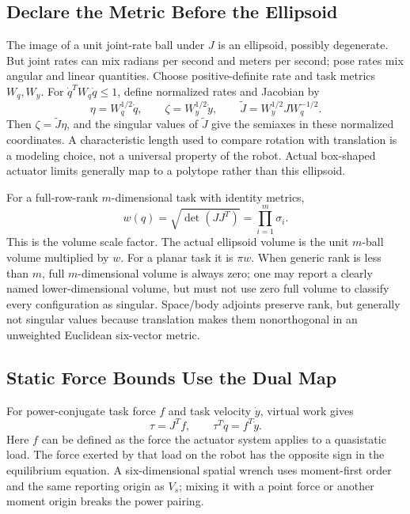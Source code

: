 \subsection{Declare the Metric Before the Ellipsoid}
\label{def:manipulability}\label{def:velocity_ellipsoid}

The image of a unit joint-rate ball under $J$ is an ellipsoid, possibly degenerate. But joint rates can mix radians per second and meters per second; pose rates mix angular and linear quantities. Choose positive-definite rate and task metrics $W_q,W_y$. For $\dot q^TW_q\dot q\leq1$, define normalized rates and Jacobian by
\begin{equation}
 \eta=W_q^{1/2}\dot q,\qquad \zeta=W_y^{1/2}\dot y,
 \qquad \widetilde J=W_y^{1/2}JW_q^{-1/2}.
\end{equation}
Then $\zeta=\widetilde J\eta$, and the singular values of $\widetilde J$ give the semiaxes in these normalized coordinates. A characteristic length used to compare rotation with translation is a modeling choice, not a universal property of the robot. Actual box-shaped actuator limits generally map to a polytope rather than this ellipsoid.

For a full-row-rank $m$-dimensional task with identity metrics,
\begin{equation}
 \label{eq:manipulability}
 w(q)=\sqrt{\det(JJ^T)}=\prod_{i=1}^m\sigma_i.
\end{equation}
This is the volume scale factor. The actual ellipsoid volume is the unit $m$-ball volume multiplied by $w$. For a planar task it is $\pi w$. When generic rank is less than $m$, full $m$-dimensional volume is always zero; one may report a clearly named lower-dimensional volume, but must not use zero full volume to classify every configuration as singular. Space/body adjoints preserve rank, but generally not singular values because translation makes them nonorthogonal in an unweighted Euclidean six-vector metric.

\subsection{Static Force Bounds Use the Dual Map}
\label{def:force_ellipsoid}\label{laymans:manipulability_duality}

For power-conjugate task force $f$ and task velocity $\dot y$, virtual work gives
\begin{equation}
 \tau=J^Tf,\qquad \tau^T\dot q=f^T\dot y.
\end{equation}
Here $f$ can be defined as the force the actuator system applies to a quasistatic load. The force exerted by that load on the robot has the opposite sign in the equilibrium equation. A six-dimensional spatial wrench uses moment-first order and the same reporting origin as $V_s$; mixing it with a point force or another moment origin breaks the power pairing.


